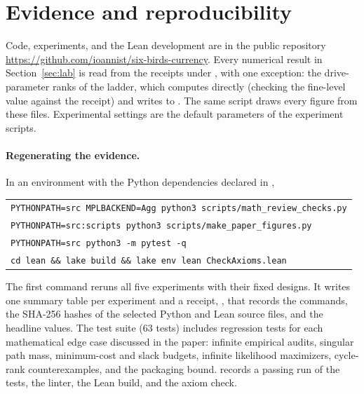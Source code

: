 \section{Evidence and reproducibility}\label{app:repro}

Code, experiments, and the Lean development are in the public repository \url{https://github.com/ioannist/six-birds-currency}. Every numerical result in Section~\ref{sec:lab} is read from the receipts under , with one exception: the drive-parameter ranks of the ladder, which  computes directly (checking the fine-level value against the receipt) and writes to . The same script draws every figure from these files. Experimental settings are the default parameters of the experiment scripts.

\paragraph{Regenerating the evidence.} In an environment with the Python dependencies declared in ,
\begin{center}
\small
\begin{tabular}{l}
\texttt{PYTHONPATH=src MPLBACKEND=Agg python3 scripts/math\_review\_checks.py}\\
\texttt{PYTHONPATH=src:scripts python3 scripts/make\_paper\_figures.py}\\
\texttt{PYTHONPATH=src python3 -m pytest -q}\\
\texttt{cd lean \&\& lake build \&\& lake env lean CheckAxioms.lean}
\end{tabular}
\end{center}
The first command reruns all five experiments with their fixed designs. It writes one summary table per experiment and a receipt, , that records the commands, the SHA-256 hashes of the selected Python and Lean source files, and the headline values. The test suite (63 tests) includes regression tests for each mathematical edge case discussed in the paper: infinite empirical audits, singular path mass, minimum-cost and slack budgets, infinite likelihood maximizers, cycle-rank counterexamples, and the packaging bound.  records a passing run of the tests, the linter, the Lean build, and the axiom check.

